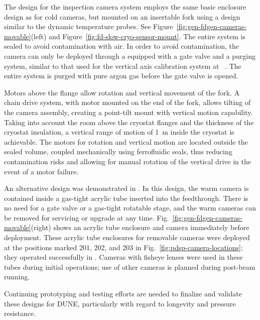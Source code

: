 The design for the inspection camera system employs the same basic
enclosure design as for cold cameras, but mounted on an insertable
fork using a design similar to the dynamic temperature probes. See
Figure~\ref{fig:gen-fdgen-cameras-movable}(left) and
Figure~\ref{fig:fd-slow-cryo-sensor-mount}.  The entire system is sealed to
avoid contamination with air. In order to avoid contamination, the
camera can only be deployed through a \fdth equipped with a gate
valve and a purging system, similar to that used for the vertical axis
calibration system at \kamland~\cite{Banks:2014hra}. The entire system
is  purged with pure argon gas before the gate valve is opened.

Motors above the flange allow rotation and vertical movement of the fork. 
 A chain drive system, with motor
mounted on the end of the fork, allows tilting of the camera assembly, 
creating a point-tilt mount with vertical motion capability.
Taking into account the room above the cryostat flanges and the
thickness of the cryostat insulation, a vertical range of motion of
\SI{1}{m} inside the cryostat is achievable.
The motors for rotation and vertical motion are located outside the sealed
volume, coupled mechanically using ferrofluidic seals, thus reducing
contamination risks and allowing for manual rotation of the vertical
drive in the event of a motor failure.  

An alternative design was demonstrated in . In this design, the warm camera is contained inside a gas-tight acrylic tube inserted into the feedthrough. There is no need for a gate valve or a gas-tight rotatable stage, and the warm cameras can be removed for servicing or upgrade at any time. Fig.~\ref{fig:gen-fdgen-cameras-movable}(right) shows an acrylic tube enclosure and camera immediately before deployment. These acrylic tube enclosures for removable cameras were deployed at the positions marked 201, 202, and 203 in Fig.~\ref{fig:pdsp-camera-locations}; they operated successfully in . Cameras with fisheye lenses were used in these tubes during initial operations; use of other cameras is planned during post-beam running.

Continuing prototyping and testing efforts are needed to finalize and validate these designs for DUNE, particularly with regard to longevity and pressure resistance.


